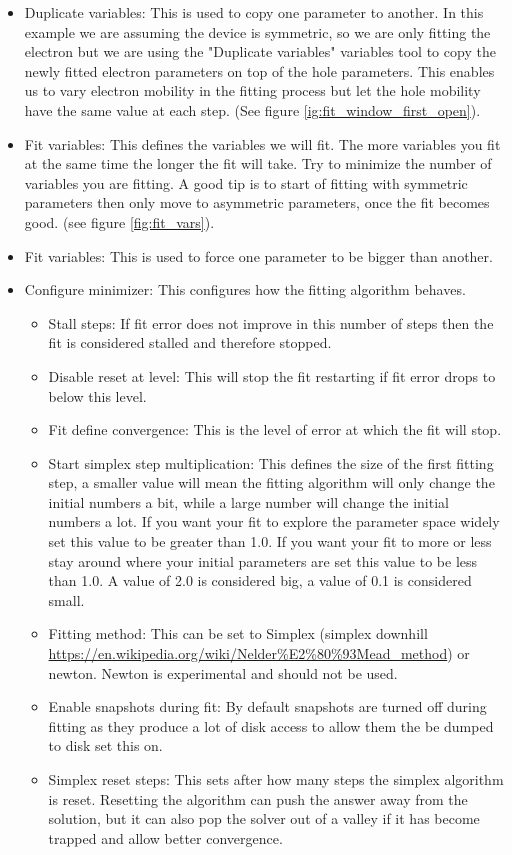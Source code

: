\begin{itemize}
  \item Duplicate variables: This is used to copy one parameter to another.  In this example we are assuming the device is symmetric, so we are only fitting the electron but we are using the "Duplicate variables" variables tool to copy the newly fitted electron parameters on top of the hole parameters. This enables us to vary electron mobility in the fitting process but let the hole mobility have the same value at each step. (See figure \ref{ig:fit_window_first_open}).
  \item Fit variables: This defines the variables we will fit.  The more variables you fit at the same time the longer the fit will take. Try to minimize the number of variables you are fitting. A good tip is to start of fitting with symmetric parameters then only move to asymmetric parameters, once the fit becomes good. (see figure \ref{fig:fit_vars}).
  \item Fit variables: This is used to force one parameter to be bigger than another.
  \item Configure minimizer: This configures how the fitting algorithm behaves.
	\begin{itemize}
	  \item Stall steps: If fit error does not improve in this number of steps then the fit is considered stalled and therefore stopped.
	  \item Disable reset at level: This will stop the fit restarting if fit error drops to below this level.
 	  \item Fit define convergence: This is the level of error at which the fit will stop.
  	  \item Start simplex step multiplication:  This defines the size of the first fitting step, a smaller value will mean the fitting algorithm will only change the initial numbers a bit, while a large number will change the initial numbers a lot. If you want your fit to explore the parameter space widely set this value to be greater than 1.0. If you want your fit to more or less stay around where your initial parameters are set this value to be less than 1.0.  A value of 2.0 is considered big, a value of 0.1 is considered small.
   	  \item Fitting method: This can be set to Simplex (simplex downhill \url{https://en.wikipedia.org/wiki/Nelder%E2%80%93Mead_method}) or newton. Newton is experimental and should not be used.
   	  \item Enable snapshots during fit: By default snapshots are turned off during fitting as they produce a lot of disk access to allow them the be dumped to disk set this on.
      \item Simplex reset steps: This sets after how many steps the simplex algorithm is reset. Resetting the algorithm can push the answer away from the solution, but it can also pop the solver out of a valley if it has become trapped and allow better convergence.
	\end{itemize}
\end{itemize}

